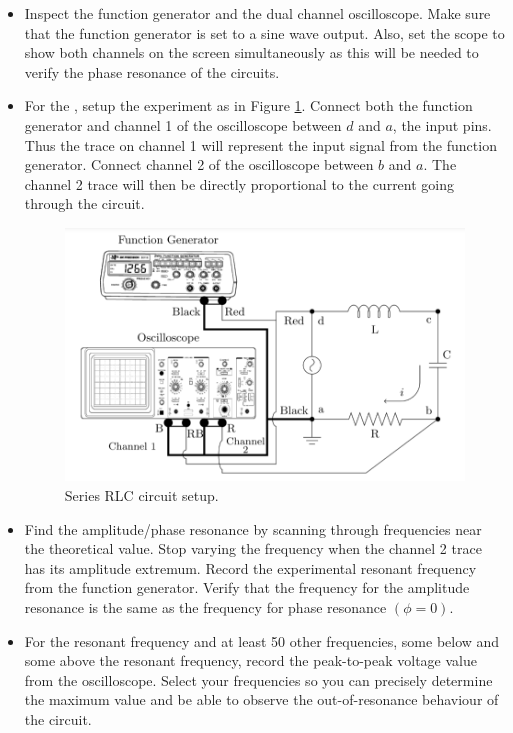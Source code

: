 \begin{itemize}[leftmargin = 50pt]
    \item[Step 1:] Inspect the function generator and the dual channel oscilloscope. Make sure that the function generator is set to a sine wave output. Also, set the scope to show both channels on the screen simultaneously as this will be needed to verify the phase resonance of the circuits.
    \item[Step 2:] For the , setup the experiment as in Figure \ref{fig:Res4}. Connect both the function generator and channel 1 of the oscilloscope between $d$ and $a$, the input pins. Thus the trace on channel 1 will represent the input signal from the function generator. Connect channel 2 of the oscilloscope between $b$ and $a$. The channel 2 trace will then be directly proportional to the current going through the circuit.

        \begin{figure}[H]
    \centering
    \includegraphics[scale = 0.8]{Images/Res4.PNG}
    \caption{Series RLC circuit setup.}
    \label{fig:Res4}
\end{figure}
    \item[Step 3:] Find the amplitude/phase resonance by scanning through frequencies near the theoretical value. Stop varying the frequency when the channel 2 trace has its amplitude extremum. Record the experimental resonant frequency from the function generator. Verify that the frequency for the amplitude resonance is the same as the frequency for phase resonance $(\phi = 0)$.
    \item[Step 4:] For the resonant frequency and at least 50 other frequencies, some below and some above the resonant frequency, record the peak-to-peak voltage value from the oscilloscope. Select your frequencies so you can precisely determine the maximum value and be able to observe the out-of-resonance behaviour of the circuit.
\end{itemize}


